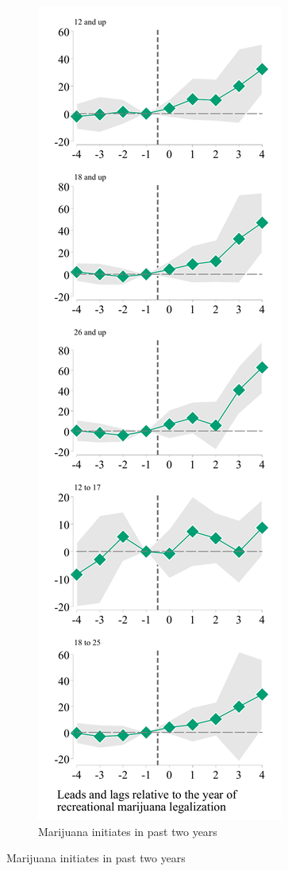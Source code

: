 \documentclass[12pt]{article}%
\begin{document}
\begin{figure}
\begin{minipage}{.9\linewidth}
\begin{subfigure}[b]{0.32\columnwidth}
        \end{subfigure}
            \hfill %
        \begin{subfigure}[b]{0.32\columnwidth}
            \caption{\scriptsize{Marijuana initiates in past two years}}
            \includegraphics[width=\linewidth]{../output/plots/full-balanced-event-study-estimates-ln-mj_first_use.pdf}

\end{subfigure}
\end{minipage}
\end{figure}
\end{document}
